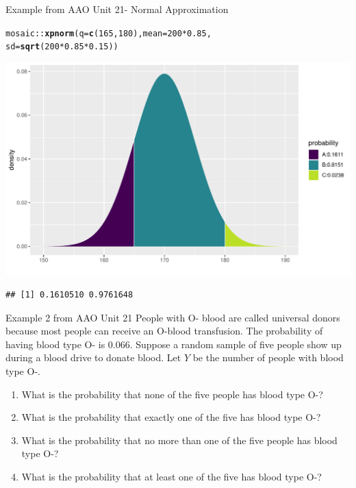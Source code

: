 \documentclass[handout]{beamer}\usepackage[]{graphicx}\usepackage[]{color}
\newcommand{\hlnum}[1]{\textcolor[rgb]{0.686,0.059,0.569}{#1}}%
\newcommand{\hlopt}[1]{\textcolor[rgb]{0,0,0}{#1}}%
\newcommand{\hlstd}[1]{\textcolor[rgb]{0.345,0.345,0.345}{#1}}%
\newcommand{\hlkwc}[1]{\textcolor[rgb]{0.333,0.667,0.333}{#1}}%
\newcommand{\hlkwd}[1]{\textcolor[rgb]{0.737,0.353,0.396}{\textbf{#1}}}%
\newenvironment{knitrout}{}{} %
\begin{document}
\begin{frame}[fragile]{Example from AAO Unit 21- Normal Approximation}

\begin{knitrout}\scriptsize
{}\color{fgcolor}
\begin{alltt}
\hlstd{mosaic}\hlopt{::}\hlkwd{xpnorm}\hlstd{(}\hlkwc{q} \hlstd{=} \hlkwd{c}\hlstd{(}\hlnum{165}\hlstd{,}\hlnum{180}\hlstd{),} \hlkwc{mean} \hlstd{=} \hlnum{200} \hlopt{*} \hlnum{0.85}\hlstd{,}
        \hlkwc{sd} \hlstd{=} \hlkwd{sqrt}\hlstd{(}\hlnum{200}\hlopt{*}\hlnum{0.85}\hlopt{*}\hlnum{0.15}\hlstd{))}
\end{alltt}


{\centering \includegraphics[width=1\linewidth]{figure/unnamed-chunk-7-1} 

}


\begin{verbatim}
## [1] 0.1610510 0.9761648
\end{verbatim}

\end{knitrout}
\end{frame}



\begin{frame}{Example 2 from AAO Unit 21}
People with O- blood are called universal donors because most people can receive an O-blood transfusion. The probability of having blood type O- is 0.066. Suppose a random sample of five people show up during a blood drive to donate blood. Let $Y$ be the number of people with blood type O-.

\begin{enumerate}
	\item What is the probability that none of the five people has blood type O-?
	\item What is the probability that exactly one of the five has blood type O-?
	\item What is the probability that no more than one of the five people has blood type O-?
	\item What is the probability that at least one of the five has blood type O-?
\end{enumerate}
\end{frame}
\end{document}
